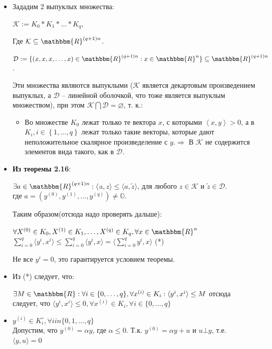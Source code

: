 \begin{itemize}
\item Зададим 2 выпуклых множества: \\
\begin{center}
    $ \mathcal{K} := K_0* K_1* \ldots * K_{q}$,
\end{center}
Где $\mathcal{K}\subseteq\mathbbm{R}^{(q+1)n}$.\\
\begin{center}
    $ \mathcal{D} := \{(x,x,x,\ldots,x)\in \mathbbm{R}^{(q+1)n} : x\in \mathbbm{R}^{n} \}\subseteq\mathbbm{R}^{(q+1)n}$.
\end{center}
Эти множества являются выпуклыми ($\mathcal{K}$ является декартовым произведением выпуклых, а $\mathcal{D}$ -- линейной оболочкой, что тоже является выпуклым множеством), при этом $\mathcal{K}\bigcap\mathcal{D}=\varnothing$, т. к.:
\begin{itemize}
    \item Во множестве $K_{0}$ лежат только те вектора $x$, с которыми $\left\langle x,y \right\rangle >0$, а в $K_{i}, i\in \left\lbrace 1,...,q\right\rbrace$ лежат только такие векторы, которые дают неположительное скалярное произведеление с $y. \Longrightarrow$ В $\mathcal{K}$ не содержится элементов вида такого, как в $\mathcal{D}$.
\end{itemize}
\item \textbf{Из теоремы 2.16}:
\begin{center}
    $\exists a\in \mathbbm{R}^{(q+1)n} : \langle $a$,z\rangle \leq \langle a,\widetilde{z}\rangle$, для любого $z \in \mathcal{K}$ и $\widetilde{z} \in \mathcal{D}$.\\
    где $a=(y^{(0)}, y^{(1)}, \ldots, y^{(q)})\neq \mathbb{O}$.
\end{center}
Таким образом(отсюда надо проверять дальше):
\begin{center}
     $\forall X^{(0)}\in K_0,  X^{(1)}\in K_1, \ldots,  X^{(q)}\in K_q, \forall x\in\mathbbm{R}^{n}$
 $\sum_{i=0}^{q}{\langle y^{i},x^{i}\rangle} \leq \sum_{i=0}^{q}{\langle y^{i},x\rangle} = \langle \sum_{i=0}^{q}{y^{i}},x\rangle $ (*)
\end{center}
Не все  $y^{i}=0$, это гарантируется условием теоремы.
\item Из (*) следует, что:
\begin{center}
     $\exists M\in\mathbbm{R}:\forall i\in \{ 0,\ldots,q\}, \forall x^{(i)}\in K_{i} :\langle y^{i},x^{i}\rangle \leq M  $
отсюда следует, что
$\langle y^{i},x^{i}\rangle \leq 0, \forall x^{(i)}\in K_{i}, \forall i\in \{ 0,\ldots,q\} $
\end{center}
\item $y^{(i)}\in K_{i}^{\circ}, \forall i in\{0,1,\ldots,q\}$\\
Допустим, что $y^{(0)}=\alpha y$, где $\alpha\leq 0$.
Т.к. $y^{(0)}=\alpha y+u$ и $u\bot y$, т.е. $\langle y,u\rangle=0$


\end{itemize}

